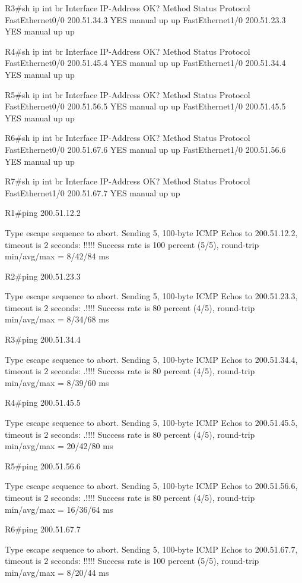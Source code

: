 \documentclass[10pt]{article}
\begin{document}
\begin{itemize}
\begin{verbatim*}
R3#sh ip int br
Interface                  IP-Address      OK? Method Status                Protocol
FastEthernet0/0            200.51.34.3     YES manual up                    up  
FastEthernet1/0            200.51.23.3     YES manual up                    up  

R4#sh ip int br
Interface                  IP-Address      OK? Method Status                Protocol
FastEthernet0/0            200.51.45.4     YES manual up                    up  
FastEthernet1/0            200.51.34.4     YES manual up                    up  

R5#sh ip int br
Interface                  IP-Address      OK? Method Status                Protocol
FastEthernet0/0            200.51.56.5     YES manual up                    up  
FastEthernet1/0            200.51.45.5     YES manual up                    up  

R6#sh ip int br
Interface                  IP-Address      OK? Method Status                Protocol
FastEthernet0/0            200.51.67.6     YES manual up                    up  
FastEthernet1/0            200.51.56.6     YES manual up                    up  

R7#sh ip int br
Interface                  IP-Address      OK? Method Status                Protocol
FastEthernet1/0            200.51.67.7     YES manual up                    up  


R1#ping 200.51.12.2

Type escape sequence to abort.
Sending 5, 100-byte ICMP Echos to 200.51.12.2, timeout is 2 seconds:
!!!!!
Success rate is 100 percent (5/5), round-trip min/avg/max = 8/42/84 ms

R2#ping 200.51.23.3

Type escape sequence to abort.
Sending 5, 100-byte ICMP Echos to 200.51.23.3, timeout is 2 seconds:
.!!!!
Success rate is 80 percent (4/5), round-trip min/avg/max = 8/34/68 ms


R3#ping 200.51.34.4

Type escape sequence to abort.
Sending 5, 100-byte ICMP Echos to 200.51.34.4, timeout is 2 seconds:
.!!!!
Success rate is 80 percent (4/5), round-trip min/avg/max = 8/39/60 ms

R4#ping 200.51.45.5

Type escape sequence to abort.
Sending 5, 100-byte ICMP Echos to 200.51.45.5, timeout is 2 seconds:
.!!!!
Success rate is 80 percent (4/5), round-trip min/avg/max = 20/42/80 ms

R5#ping 200.51.56.6

Type escape sequence to abort.
Sending 5, 100-byte ICMP Echos to 200.51.56.6, timeout is 2 seconds:
.!!!!
Success rate is 80 percent (4/5), round-trip min/avg/max = 16/36/64 ms

R6#ping 200.51.67.7

Type escape sequence to abort.
Sending 5, 100-byte ICMP Echos to 200.51.67.7, timeout is 2 seconds:
!!!!!
Success rate is 100 percent (5/5), round-trip min/avg/max = 8/20/44 ms
\end{verbatim*}
\end{itemize}
\end{document}
